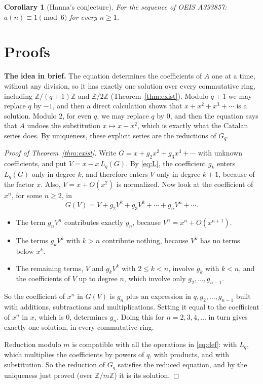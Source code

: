 \documentclass[11pt,a4paper]{article}
\newtheorem{corollary}[theorem]{Corollary}
\theoremstyle{definition}
\theoremstyle{remark}
\newcommand{\Z}{\mathbb{Z}}
\newcommand{\para}[1]{\par\medskip\noindent\textbf{#1}\enspace}
\begin{document}
\begin{corollary}[Hanna's conjecture]\label{cor:oeis}
For the sequence of OEIS A393857: $a(n)\equiv1\pmod{6}$ for every $n\ge1$.
\end{corollary}

\section{Proofs}\label{sec:proofs}

\para{The idea in brief.} The equation determines the coefficients of $A$ one at a time, without any division, so it
has exactly one solution over every commutative ring, including $\Z/(q+1)\Z$ and $\Z/2\Z$
(Theorem~\ref{thm:exist}). Modulo $q+1$ we may replace $q$ by $-1$, and then a direct calculation shows that $x+x^2+x^3+\cdots$ is
a solution. Modulo $2$, for even $q$, we may replace $q$ by $0$, and then the equation says that $A$ undoes the
substitution $x\mapsto x-x^2$, which is exactly what the Catalan series does. By uniqueness, these explicit series
are the reductions of $G_q$.

\begin{proof}[Proof of Theorem~\ref{thm:exist}]
Write $G=x+g_2x^2+g_3x^3+\cdots$ with unknown coefficients, and put $V=x-x\,L_q(G)$. By \eqref{eq:L}, the coefficient
$g_k$ enters $L_q(G)$ only in degree $k$, and therefore enters $V$ only in degree $k+1$, because of the factor $x$. Also,
$V=x+O(x^2)$ is normalized. Now look at the coefficient of $x^n$, for some $n\ge2$, in
\[
G(V)=V+g_2V^2+g_3V^3+\cdots+g_nV^n+\cdots .
\]
\begin{itemize}
\item The term $g_nV^n$ contributes exactly $g_n$, because $V^n=x^n+O(x^{n+1})$.
\item The terms $g_kV^k$ with $k>n$ contribute nothing, because $V^k$ has no terms below $x^k$.
\item The remaining terms, $V$ and $g_kV^k$ with $2\le k<n$, involve $g_k$ with $k<n$, and the coefficients of $V$ up
to degree $n$, which involve only $g_2,\dots,g_{n-1}$.
\end{itemize}
So the coefficient of $x^n$ in $G(V)$ is $g_n$ plus an expression in $q,g_2,\dots,g_{n-1}$ built with additions,
subtractions and multiplications. Setting it equal to the coefficient of $x^n$ in $x$, which is $0$, determines $g_n$.
Doing this for $n=2,3,4,\dots$ in turn gives exactly one solution, in every commutative ring.

Reduction modulo $m$ is compatible with all the operations in \eqref{eq:def}: with $L_q$, which multiplies the
coefficients by powers of $q$, with products, and with substitution. So the reduction of $G_q$ satisfies the reduced
equation, and by the uniqueness just proved (over $\Z/m\Z$) it is its solution.
\end{proof}
\end{document}
